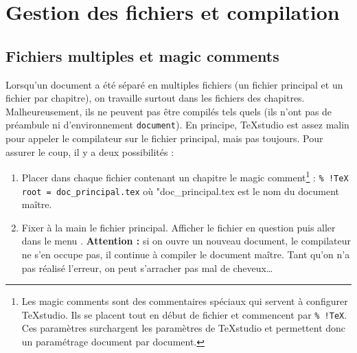 \chapter[Fichiers et compilation]{Gestion des fichiers et compilation}
\label{ch:compilation}






\section{Fichiers multiples et magic comments}

Lorsqu'un document a été séparé en multiples fichiers (un fichier principal et un fichier par chapitre), on travaille surtout dans les fichiers des chapitres. Malheureusement, ils ne peuvent pas être compilés tels quels (ils n'ont pas de préambule ni d'environnement \texttt{document}). En principe, TeXstudio est assez malin pour appeler le compilateur sur le fichier principal, mais pas toujours. Pour assurer le coup, il y a deux possibilités : 
\begin{enumerate}
	\item Placer dans chaque fichier contenant un chapitre le magic comment\footnote{Les magic comments sont des commentaires spéciaux qui servent à configurer TeXstudio. Ils se placent tout en début de fichier et commencent par \texttt{\% !TeX}. Ces paramètres surchargent les paramètres de TeXstudio et permettent donc un paramétrage document par document.} : \newline
		\lstinline|% !TeX root = doc_principal.tex| où "doc\_principal.tex est le nom du document maître.
	\item Fixer à la main le fichier principal. Afficher le fichier en question puis aller dans le menu \newline
		 \textrightarrow {}. \newline
		\textbf{Attention :} si on ouvre un nouveau document, le compilateur ne s'en occupe pas, il continue à compiler le document maître. Tant qu'on n'a pas réalisé l'erreur, on peut s'arracher pas mal de cheveux\dots
\end{enumerate}







